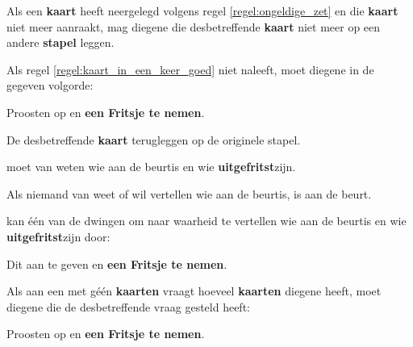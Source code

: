 
\vervolgLijst{}
\item Als \eenSpeler een \textbf{kaart} heeft neergelegd volgens regel \ref{regel:ongeldige_zet} en die \textbf{kaart} niet meer aanraakt, mag diegene die desbetreffende \textbf{kaart} niet meer op een andere \textbf{stapel} leggen.
\label{regel:kaart_in_een_keer_goed}
\eindLijst{}

\vervolgLijst{}
\item Als \eenSpeler regel \ref{regel:kaart_in_een_keer_goed} niet naleeft, moet diegene in de gegeven volgorde:
\puntLijst{}
\item Proosten op  en \textbf{een Fritsje te nemen}\footnotemark[3].
\item De desbetreffende \textbf{kaart} terugleggen op de originele stapel.
\eindPuntLijst{}
\eindLijst{}


\vervolgLijst{}
\item \EenSpeler moet van \alleSpelers weten wie aan de beurt\footnotemark[1] is en wie \textbf{uitgefritst}\footnotemark[4] zijn.
\eindLijst{}

\vervolgLijst{}
\item Als niemand van \alleSpelers weet of wil vertellen wie aan de beurt\footnotemark[1] is, is \Frits aan de beurt\footnotemark[1].
\eindLijst{}

\vervolgLijst{}
\item \EenSpeler kan \'e\'en van de \medeSpelers dwingen om naar waarheid te vertellen wie aan de beurt\footnotemark[4] is en wie \textbf{uitgefritst}\footnotemark[4] zijn door:
\puntLijst{}
\item Dit aan te geven en \textbf{een Fritsje te nemen}\footnotemark[3].
\eindPuntLijst{}
\eindLijst{}

\vervolgLijst{}
\item Als \eenSpeler aan een \andereSpeler met géén \textbf{kaarten} vraagt hoeveel \textbf{kaarten} diegene heeft\footnotemark[5], moet diegene die de desbetreffende vraag gesteld heeft:
\puntLijst{}
\item Proosten op  en \textbf{een Fritsje te nemen}\footnotemark[3].
\eindPuntLijst{}
\eindLijst{}

\footnotetext[3]{\footnoteFritsjeDesNemen}

